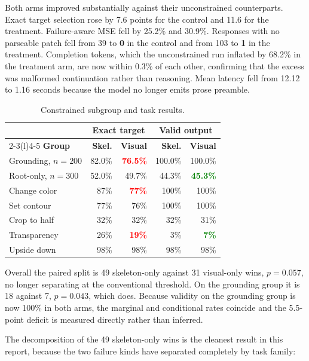 \documentclass[10pt,a4paper]{article}
\newcommand{\good}[1]{\textcolor{green}{\textbf{#1}}}
\newcommand{\bad}[1]{\textcolor{red}{\textbf{#1}}}
\begin{document}
Both arms improved substantially against their unconstrained counterparts.
Exact target selection rose by 7.6 points for the control and 11.6 for the
treatment. Failure-aware MSE fell by 25.2\% and 30.9\%. Responses with no
parseable patch fell from 39 to \textbf{0} in the control and from 103 to
\textbf{1} in the treatment. Completion tokens, which the unconstrained run
inflated by 68.2\% in the treatment arm, are now within 0.3\% of each other,
confirming that the excess was malformed continuation rather than reasoning.
Mean latency fell from 12.12 to 1.16 seconds because the model no longer
emits prose preamble.

\begin{table}[H]
\centering
\caption{Constrained subgroup and task results.}
\begin{tabular}{@{}lrrrr@{}}
\toprule
& \multicolumn{2}{c}{\textbf{Exact target}} &
\multicolumn{2}{c}{\textbf{Valid output}}\\
\cmidrule(lr){2-3}\cmidrule(l){4-5}
\textbf{Group} & \textbf{Skel.} & \textbf{Visual} & \textbf{Skel.} & \textbf{Visual}\\
\midrule
Grounding, \(n=200\) & 82.0\% & \bad{76.5\%} & 100.0\% & 100.0\%\\
Root-only, \(n=300\) & 52.0\% & 49.7\% & 44.3\% & \good{45.3\%}\\
\addlinespace
Change color & 87\% & \bad{77\%} & 100\% & 100\%\\
Set contour & 77\% & 76\% & 100\% & 100\%\\
Crop to half & 32\% & 32\% & 32\% & 31\%\\
Transparency & 26\% & \bad{19\%} & 3\% & \good{7\%}\\
Upside down & 98\% & 98\% & 98\% & 98\%\\
\bottomrule
\end{tabular}
\end{table}

Overall the paired split is 49 skeleton-only against 31 visual-only wins,
\(p=0.057\), no longer separating at the conventional threshold. On the
grounding group it is 18 against 7, \(p=0.043\), which does. Because validity
on the grounding group is now 100\% in both arms, the marginal and conditional
rates coincide and the 5.5-point deficit is measured directly rather than
inferred.

The decomposition of the 49 skeleton-only wins is the cleanest result in this
report, because the two failure kinds have separated completely by task
family:
\end{document}
